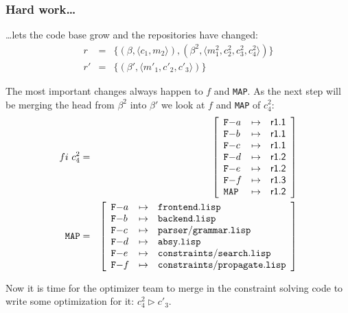 \documentclass[fleqn, 10pt, a4paper]{report} \usepackage{amssymb}
\begin{document}
\subsubsection{Hard work\ldots}

\ldots lets the code base grow and the repositories have changed:
\begin{eqnarray*}
  r &=& \{(\beta, \langle c_1, m_2\rangle), (\beta^2, \langle m_1^2, c_2^2,
  c_3^2, c_4^2\rangle)\} \\
  r' &=& \{(\beta', \langle m'_1, c'_2, c'_3\rangle)\}
\end{eqnarray*}

The most important changes always happen to $f$ and \texttt{MAP}.  As
the next step will be merging the head from $\beta^2$ into $\beta'$ we
look at $f$ and \texttt{MAP} of $c_4^2$:
\begin{eqnarray*}
  \mathnormal{fi}\ c_4^2 &=& \left[
    \begin{array}{lcl}
      \mathtt{F-}a & \mapsto & \mathsf{r1.1} \\
      \mathtt{F-}b & \mapsto & \mathsf{r1.1} \\
      \mathtt{F-}c & \mapsto & \mathsf{r1.1} \\
      \mathtt{F-}d & \mapsto & \mathsf{r1.2} \\
      \mathtt{F-}e & \mapsto & \mathsf{r1.2} \\
      \mathtt{F-}f & \mapsto & \mathsf{r1.3} \\
      \mathtt{MAP} & \mapsto & \mathsf{r1.2} \\
    \end{array}\right] \\
  \mathtt{MAP} &=& \left[
    \begin{array}{lcl}
      \mathtt{F-}a &\mapsto& \mathtt{frontend.lisp} \\
      \mathtt{F-}b &\mapsto& \mathtt{backend.lisp} \\
      \mathtt{F-}c &\mapsto& \mathtt{parser/grammar.lisp} \\
      \mathtt{F-}d &\mapsto& \mathtt{absy.lisp} \\
      \mathtt{F-}e &\mapsto& \mathtt{constraints/search.lisp} \\
      \mathtt{F-}f &\mapsto& \mathtt{constraints/propagate.lisp} \\
    \end{array}\right]
\end{eqnarray*}

Now it is time for the optimizer team to merge in the constraint
solving code to write some optimization for it: $c_4^2 \rhd c'_3$.
\end{document}
